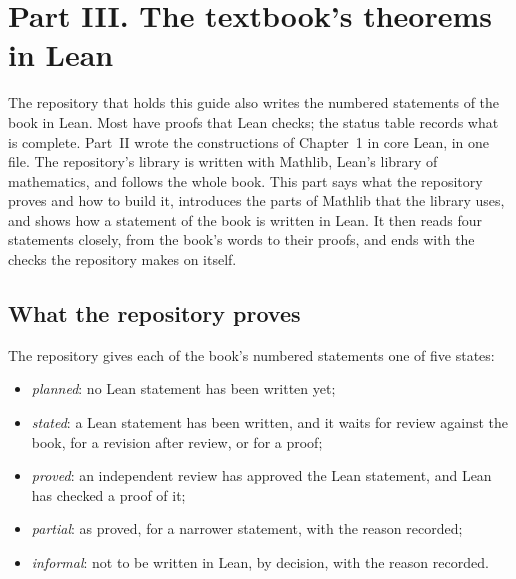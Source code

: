 \chapter*{Part III. The textbook's theorems in Lean}

The repository that holds this guide also writes the numbered statements of
the book in Lean. Most have proofs that Lean checks; the status table records
what is complete. Part~II wrote the
constructions of Chapter~1 in core Lean, in one file. The repository's
library is written with Mathlib, Lean's library of mathematics, and follows
the whole book. This part says what the repository proves and how to build
it, introduces the parts of Mathlib that the library uses, and shows how a
statement of the book is written in Lean. It then reads four statements
closely, from the book's words to their proofs, and ends with the checks the
repository makes on itself.

\section*{What the repository proves}

The repository gives each of the book's \statustotal{} numbered statements
one of five states:
\begin{itemize}[leftmargin=1.4em]
\item \emph{planned}: no Lean statement has been written yet;
\item \emph{stated}: a Lean statement has been written, and it waits for review
  against the book, for a revision after review, or for a proof;
\item \emph{proved}: an independent review has approved the Lean
  statement, and Lean has checked a proof of it;
\item \emph{partial}: as proved, for a narrower statement, with the reason
  recorded;
\item \emph{informal}: not to be written in Lean, by decision, with the
  reason recorded.
\end{itemize}

